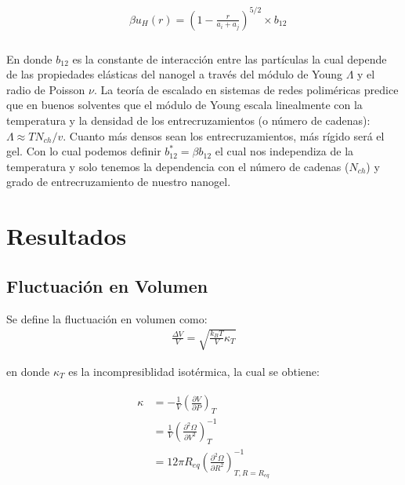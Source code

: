 \begin{align}
	\begin{aligned}
		& \beta u_H (r) = \left(1-\frac{r}{a_i + a_j}\right)^{5/2}\times b_{12} \\
	\end{aligned}
\end{align}


En donde $b_{12}$ es la constante de interacci\'on entre las part\'iculas la cual depende de las propiedades el\'asticas del nanogel a trav\'es del m\'odulo de Young $\Lambda$ y el radio de Poisson $\nu$. \addcite[landau] La teor\'ia de escalado en sistemas de redes polim\'ericas predice que en buenos solventes \addcite que el m\'odulo de Young  escala linealmente con la temperatura y la densidad de los entrecruzamientos (o n\'umero de cadenas): $\Lambda \approx TN_{ch}/v$. Cuanto m\'as densos sean los entrecruzamientos, m\'as r\'igido ser\'a el gel.
Con lo cual podemos definir $b_{12}^\ast = \beta b_{12}$ el cual nos independiza de la temperatura y solo tenemos la dependencia con el n\'umero de cadenas ($N_{ch}$) y grado de entrecruzamiento de nuestro nanogel. 




\section{Resultados}


\subsection{Fluctuaci\'on en Volumen}
Se define la fluctuaci\'on en volumen como:
\begin{align}
	\frac{\Delta V}{V} = \sqrt{\frac{k_BT}{V}\kappa_T}
\end{align}

\noindent en donde $\kappa_T$ es la incompresiblidad isot\'ermica, la cual se obtiene:

\begin{align}
	\begin{aligned}
		\kappa & = -\frac{1}{V} \left( \frac{\partial V}{\partial P}\right)_T \\
		& =\frac{1}{V} \left( \frac{\partial^2 \Omega}{\partial V^2}\right)^{-1}_T \\
		& = 12 \pi R_{eq} \left( \frac{\partial^2 \Omega}{\partial R^2}\right)^{-1}_{T,R=R_{eq}}
	\end{aligned}
\end{align}



